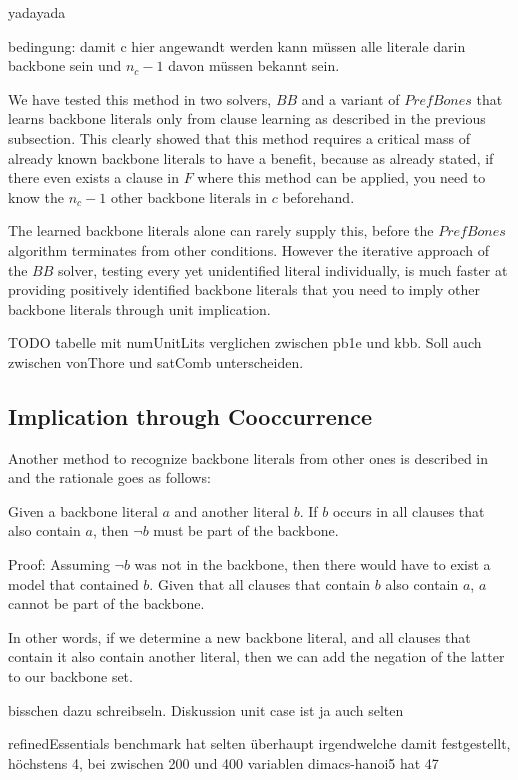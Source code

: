 yadayada

bedingung: damit c hier angewandt werden kann müssen alle literale darin backbone sein und $n_c - 1$ davon müssen bekannt sein.


We have tested this method in two solvers, $BB$ and a variant of $PrefBones$ that learns backbone literals only from clause learning as described in the previous subsection. This clearly showed that this method requires a critical mass of already known backbone literals to have a benefit, because as already stated, if there even exists a clause in $F$ where this method can be applied, you need to know the $n_c - 1$ other backbone literals in $c$ beforehand.

The learned backbone literals alone can rarely supply this, before the $PrefBones$ algorithm terminates from other conditions. However the iterative approach of the $BB$ solver, testing every yet unidentified literal individually, is much faster at providing positively identified backbone literals that you need to imply other backbone literals through unit implication.

TODO tabelle mit numUnitLits verglichen zwischen pb1e und kbb. Soll auch zwischen vonThore und satComb unterscheiden.

\subsection{Implication through Cooccurrence}

Another method to recognize backbone literals from other ones is described in \cite{wbxcl16} and the rationale goes as follows:
\begin{lemma}
Given a backbone literal $a$ and another literal $b$. If $b$ occurs in all clauses that also contain $a$, then $\neg b$ must be part of the backbone. 

Proof: Assuming $\neg b$ was not in the backbone, then there would have to exist a model that contained $b$. Given that all clauses that contain $b$ also contain $a$, $a$ cannot be part of the backbone.
\end{lemma}

In other words, if we determine a new backbone literal, and all clauses that contain it also contain another literal, then we can add the negation of the latter to our backbone set. 

bisschen dazu schreibseln. Diskussion unit case ist ja auch selten

refinedEssentials benchmark hat selten überhaupt irgendwelche damit festgestellt, höchstens 4, bei zwischen 200 und 400 variablen
dimacs-hanoi5 hat 47

